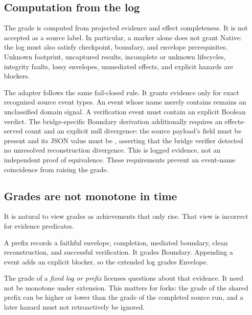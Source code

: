 \subsection{Computation from the log}

The grade is computed from projected evidence and effect completeness.  It is
not accepted as a source label.  In particular, a  marker
alone does not grant Native: the log must also satisfy checkpoint, boundary,
and envelope prerequisites.  Unknown footprint, uncaptured results, incomplete
or unknown lifecycles, integrity faults, lossy envelopes, unmediated effects,
and explicit hazards are blockers.

The adapter follows the same fail-closed rule.  It grants evidence only for
exact recognized source event types.  An event whose name merely contains
 remains an unclassified domain signal.  A verification
event must contain an explicit Boolean verdict.  The bridge-specific Boundary
derivation additionally requires an effects-served count and an explicit null
divergence: the source payload's  field must be present and its
JSON value must be , asserting that the bridge verifier detected no
unresolved reconstruction divergence.  This is logged evidence, not an
independent proof of equivalence.  These requirements prevent an event-name
coincidence from raising the grade.

\subsection{Grades are not monotone in time}

It is natural to view grades as achievements that only rise.  That view is
incorrect for evidence predicates.

\begin{counterexample}
A prefix records a faithful envelope, completion, mediated boundary, clean
reconstruction, and successful verification.  It grades Boundary.  Appending a
 event adds an explicit blocker,
so the extended log grades Envelope.
\end{counterexample}

The grade of a \emph{fixed log or prefix} licenses questions about that evidence.
It need not be monotone under extension.  This matters for forks: the grade of
the shared prefix can be higher or lower than the grade of the completed source
run, and a later hazard must not retroactively be ignored.

